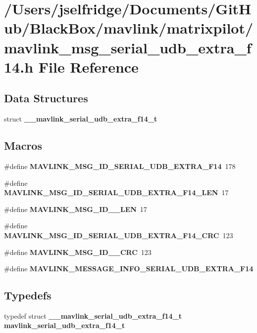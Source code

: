 \section{/\+Users/jselfridge/\+Documents/\+Git\+Hub/\+Black\+Box/mavlink/matrixpilot/mavlink\+\_\+msg\+\_\+serial\+\_\+udb\+\_\+extra\+\_\+f14.h File Reference}
\label{mavlink__msg__serial__udb__extra__f14_8h}
\subsection*{Data Structures}
\begin{DoxyCompactItemize}
\item 
struct \textbf{ \+\_\+\+\_\+mavlink\+\_\+serial\+\_\+udb\+\_\+extra\+\_\+f14\+\_\+t}
\end{DoxyCompactItemize}
\subsection*{Macros}
\begin{DoxyCompactItemize}
\item 
\#define \textbf{ M\+A\+V\+L\+I\+N\+K\+\_\+\+M\+S\+G\+\_\+\+I\+D\+\_\+\+S\+E\+R\+I\+A\+L\+\_\+\+U\+D\+B\+\_\+\+E\+X\+T\+R\+A\+\_\+\+F14}~178
\item 
\#define \textbf{ M\+A\+V\+L\+I\+N\+K\+\_\+\+M\+S\+G\+\_\+\+I\+D\+\_\+\+S\+E\+R\+I\+A\+L\+\_\+\+U\+D\+B\+\_\+\+E\+X\+T\+R\+A\+\_\+\+F14\+\_\+\+L\+EN}~17
\item 
\#define \textbf{ M\+A\+V\+L\+I\+N\+K\+\_\+\+M\+S\+G\+\_\+\+I\+D\+\_\+\_\+\+L\+EN}~17
\item 
\#define \textbf{ M\+A\+V\+L\+I\+N\+K\+\_\+\+M\+S\+G\+\_\+\+I\+D\+\_\+\+S\+E\+R\+I\+A\+L\+\_\+\+U\+D\+B\+\_\+\+E\+X\+T\+R\+A\+\_\+\+F14\+\_\+\+C\+RC}~123
\item 
\#define \textbf{ M\+A\+V\+L\+I\+N\+K\+\_\+\+M\+S\+G\+\_\+\+I\+D\+\_\+\_\+\+C\+RC}~123
\item 
\#define \textbf{ M\+A\+V\+L\+I\+N\+K\+\_\+\+M\+E\+S\+S\+A\+G\+E\+\_\+\+I\+N\+F\+O\+\_\+\+S\+E\+R\+I\+A\+L\+\_\+\+U\+D\+B\+\_\+\+E\+X\+T\+R\+A\+\_\+\+F14}
\end{DoxyCompactItemize}
\subsection*{Typedefs}
\begin{DoxyCompactItemize}
\item 
typedef struct \textbf{ \+\_\+\+\_\+mavlink\+\_\+serial\+\_\+udb\+\_\+extra\+\_\+f14\+\_\+t} \textbf{ mavlink\+\_\+serial\+\_\+udb\+\_\+extra\+\_\+f14\+\_\+t}
\end{DoxyCompactItemize}


